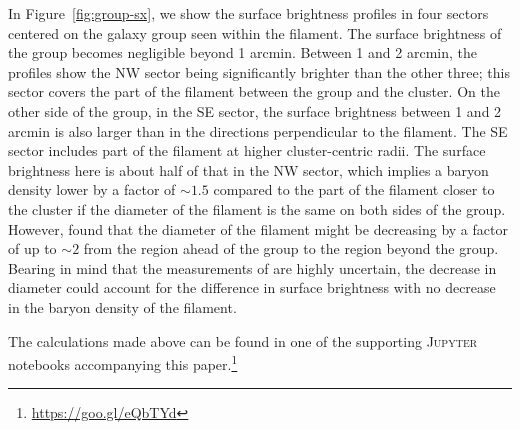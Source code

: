 In Figure~\ref{fig:group-sx}, we show the surface brightness profiles in four sectors centered on the galaxy group seen within the filament. The surface brightness of the group becomes negligible beyond 1 arcmin. Between 1 and 2 arcmin, the profiles show the NW sector being significantly brighter than the other three; this sector covers the part of the filament between the group and the cluster. On the other side of the group, in the SE sector, the surface brightness between 1 and 2 arcmin is also larger than in the directions perpendicular to the filament. The SE sector includes part of the filament at higher cluster-centric radii. The surface brightness here is about half of that in the NW sector, which implies a baryon density lower by a factor of $\sim 1.5$ compared to the part of the filament closer to the cluster if the diameter of the filament is the same on both sides of the group. However, \citet{Jauzac2012} found that the diameter of the filament might be decreasing by a factor of up to $\sim 2$ from the region ahead of the group to the region beyond the group. Bearing in mind that the measurements of \citet{Jauzac2012} are highly uncertain, the decrease in diameter could account for the difference in surface brightness with no decrease in the baryon density of the filament.

The calculations made above can be found in one of the supporting \textsc{Jupyter} notebooks accompanying this paper.\footnote{\url{https://goo.gl/eQbTYd}}





